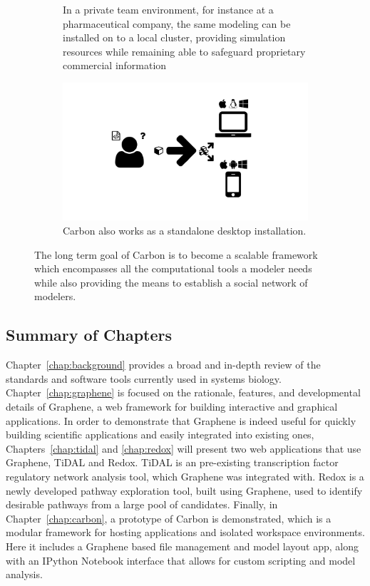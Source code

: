 \begin{figure}
\begin{subfigure}[b]{0.45\textwidth}
    \caption{In a private team environment, for instance at a pharmaceutical company, the same modeling can be installed on to a local cluster, providing simulation resources while remaining able to safeguard proprietary commercial information}
    \label{Figure:redox-table-pinned}
  \end{subfigure}
  \begin{subfigure}[t]{0.45\textwidth}
    \includegraphics[width=\textwidth, page=32, trim=0cm 0cm 17cm 12cm, clip=true]{images/Figures.pdf}
    \caption{Carbon also works as a standalone desktop installation.}
    \label{Figure:redox-table-pinned}
  \end{subfigure}
  \caption{
  The long term goal of Carbon is to become a scalable framework which encompasses all the computational tools a modeler needs while also providing the means to establish a social network of modelers.
  }
  \label{Figure:redox-table}
\end{figure}

\subsection{Summary of Chapters}

Chapter~\ref{chap:background} provides a broad and in-depth review of the standards and software tools currently used in systems biology.
Chapter~\ref{chap:graphene} is focused on the rationale, features, and developmental details of Graphene, a web framework for building interactive and graphical applications.
In order to demonstrate that Graphene is indeed useful for quickly building scientific applications and easily integrated into existing ones, Chapters~\ref{chap:tidal} and \ref{chap:redox} will present two web applications that use Graphene, TiDAL and Redox.
TiDAL is an pre-existing transcription factor regulatory network analysis tool, which Graphene was integrated with.
Redox is a newly developed pathway exploration tool, built using Graphene, used to identify desirable pathways from a large pool of candidates.
Finally, in Chapter~\ref{chap:carbon}, a prototype of Carbon is demonstrated, which is a modular framework for hosting applications and isolated workspace environments.
Here it includes a Graphene based file management and model layout app, along with an IPython Notebook interface that allows for custom scripting and model analysis.
